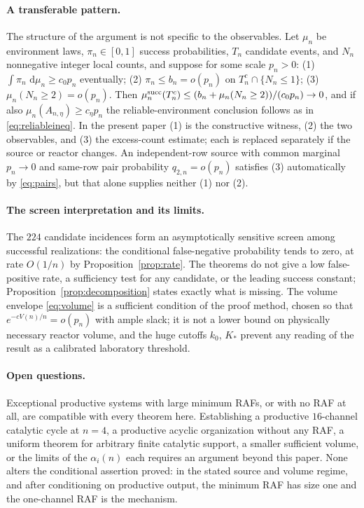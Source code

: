 \documentclass[11pt,letterpaper]{article}
\theoremstyle{plain}
\theoremstyle{definition}
\theoremstyle{remark}
\numberwithin{equation}{section}
\newcommand{\dd}{\,\mathrm d}
\begin{document}
\paragraph{A transferable pattern.}
The structure of the argument is not specific to the observables. Let $\mu_n$ be environment laws, $\pi_n\in[0,1]$ success probabilities, $T_n$ candidate events, and $N_n$ nonnegative integer local counts, and suppose for some scale $p_n>0$: (1) $\int\pi_n\,\dd\mu_n\ge c_0p_n$ eventually; (2) $\pi_n\le b_n=o(p_n)$ on $T_n^c\cap\{N_n\le1\}$; (3) $\mu_n(N_n\ge2)=o(p_n)$. Then $\mu_n^{\rm succ}(T_n^c)\le(b_n+\mu_n(N_n\ge2))/(c_0p_n)\to0$, and if also $\mu_n(A_{n,\eta})\ge c_\eta p_n$ the reliable-environment conclusion follows as in \eqref{eq:reliableineq}. In the present paper (1) is the constructive witness, (2) the two observables, and (3) the excess-count estimate; each is replaced separately if the source or reactor changes. An independent-row source with common marginal $p_n\to0$ and same-row pair probability $q_{2,n}=o(p_n)$ satisfies (3) automatically by \eqref{eq:pairs}, but that alone supplies neither (1) nor (2).

\paragraph{The screen interpretation and its limits.}
The $224$ candidate incidences form an asymptotically sensitive screen among successful realizations: the conditional false-negative probability tends to zero, at rate $O(1/n)$ by Proposition~\ref{prop:rate}. The theorems do not give a low false-positive rate, a sufficiency test for any candidate, or the leading success constant; Proposition~\ref{prop:decomposition} states exactly what is missing. The volume envelope \eqref{eq:volume} is a sufficient condition of the proof method, chosen so that $e^{-cV(n)/n}=o(p_n)$ with ample slack; it is not a lower bound on physically necessary reactor volume, and the huge cutoffs $k_0$, $K_*$ prevent any reading of the result as a calibrated laboratory threshold.

\paragraph{Open questions.}
Exceptional productive systems with large minimum RAFs, or with no RAF at all, are compatible with every theorem here. Establishing a productive $16$-channel catalytic cycle at $n=4$, a productive acyclic organization without any RAF, a uniform theorem for arbitrary finite catalytic support, a smaller sufficient volume, or the limits of the $\alpha_i(n)$ each requires an argument beyond this paper. None alters the conditional assertion proved: in the stated source and volume regime, and after conditioning on productive output, the minimum RAF has size one and the one-channel RAF is the mechanism.
\end{document}
